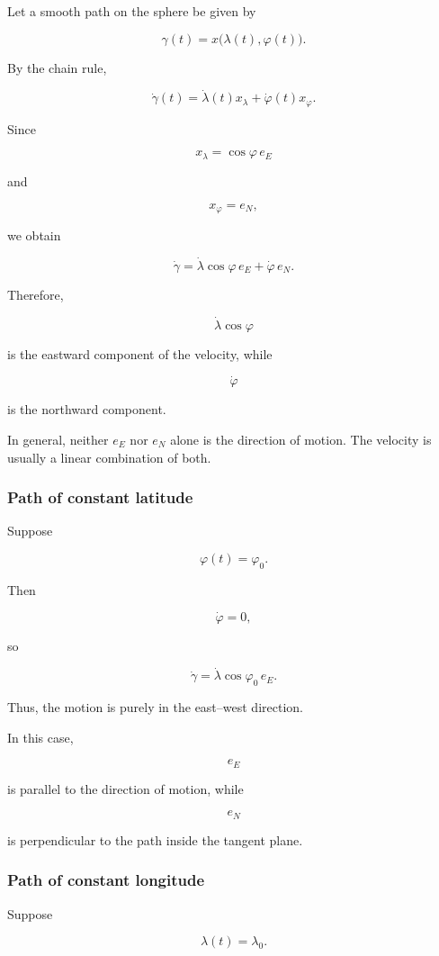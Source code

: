\documentclass[12pt,a4paper]{article}
\theoremstyle{notespace}
\begin{document}
Let a smooth path on the sphere be given by

\[
\gamma(t)
=
x\bigl(\lambda(t),\varphi(t)\bigr).
\]

By the chain rule,

\[
\dot\gamma(t)
=
\dot\lambda(t)x_\lambda
+
\dot\varphi(t)x_\varphi.
\]

Since

\[
x_\lambda=\cos\varphi\,e_E
\]

and

\[
x_\varphi=e_N,
\]

we obtain

\[
\boxed{
	\dot\gamma
	=
	\dot\lambda\cos\varphi\,e_E
	+
	\dot\varphi\,e_N.
}
\]

Therefore,

\[
\dot\lambda\cos\varphi
\]

is the eastward component of the velocity, while

\[
\dot\varphi
\]

is the northward component.

In general, neither \(e_E\) nor \(e_N\) alone is the direction of
motion. The velocity is usually a linear combination of both.

\subsubsection{Path of constant latitude}

Suppose

\[
\varphi(t)=\varphi_0.
\]

Then

\[
\dot\varphi=0,
\]

so

\[
\dot\gamma
=
\dot\lambda\cos\varphi_0\,e_E.
\]

Thus, the motion is purely in the east--west direction.

In this case,

\[
e_E
\]

is parallel to the direction of motion, while

\[
e_N
\]

is perpendicular to the path inside the tangent plane.

\subsubsection{Path of constant longitude}

Suppose

\[
\lambda(t)=\lambda_0.
\]
\end{document}

